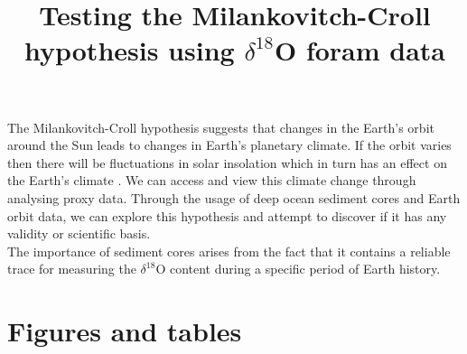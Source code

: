\documentclass[12pt, onecolumn]{revtex4}    %
\begin{document}
                     

\title{Testing the Milankovitch-Croll hypothesis using $\delta^{18}$O foram data} 
\maketitle

\vspace{-4ex}

The Milankovitch-Croll hypothesis suggests that changes in the Earth's orbit around the Sun leads to changes in Earth's planetary climate. If the orbit varies then there will be fluctuations in solar insolation which in turn has an effect on the Earth's climate \cite{ruddiman_climate}. We can access and view this climate change through analysing proxy data. Through the usage of deep ocean sediment cores and Earth orbit data, we can explore this hypothesis and attempt to discover if it has any validity or scientific basis. \\

The importance of sediment cores arises from the fact that it contains a reliable trace for measuring the $\delta^{18}$O content during a specific period of Earth history. 

\newpage





\section*{Figures and tables}
\end{document}
